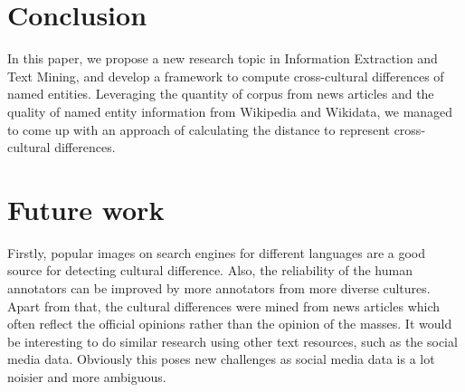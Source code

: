 
\section{Conclusion}
In this paper, we propose a new research topic in Information Extraction and Text Mining, and develop a framework to compute cross-cultural differences of named entities.
Leveraging the quantity of corpus from news articles and the quality of named entity information from Wikipedia and Wikidata, we managed to come up with an approach of calculating the distance to represent cross-cultural differences. 
\section{Future work}
%
Firstly, popular images on search engines for different
languages are a good source for detecting cultural difference. 
Also, the reliability of the human annotators can be improved by more
annotators from more diverse cultures.
Apart from that, the cultural differences were mined from news articles which often
reflect the official opinions rather than the opinion of the masses.
It would be interesting to do similar research using other text
resources, such as the social media data. Obviously this poses new
challenges as social media data is a lot noisier and more ambiguous.

